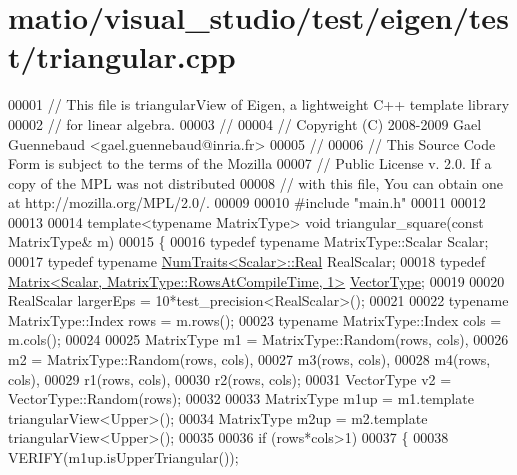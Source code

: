 \hypertarget{matio_2visual__studio_2test_2eigen_2test_2triangular_8cpp_source}{}\section{matio/visual\+\_\+studio/test/eigen/test/triangular.cpp}
\label{matio_2visual__studio_2test_2eigen_2test_2triangular_8cpp_source}

\begin{DoxyCode}
00001 \textcolor{comment}{// This file is triangularView of Eigen, a lightweight C++ template library}
00002 \textcolor{comment}{// for linear algebra.}
00003 \textcolor{comment}{//}
00004 \textcolor{comment}{// Copyright (C) 2008-2009 Gael Guennebaud <gael.guennebaud@inria.fr>}
00005 \textcolor{comment}{//}
00006 \textcolor{comment}{// This Source Code Form is subject to the terms of the Mozilla}
00007 \textcolor{comment}{// Public License v. 2.0. If a copy of the MPL was not distributed}
00008 \textcolor{comment}{// with this file, You can obtain one at http://mozilla.org/MPL/2.0/.}
00009 
00010 \textcolor{preprocessor}{#include "main.h"}
00011 
00012 
00013 
00014 \textcolor{keyword}{template}<\textcolor{keyword}{typename} MatrixType> \textcolor{keywordtype}{void} triangular\_square(\textcolor{keyword}{const} MatrixType& m)
00015 \{
00016   \textcolor{keyword}{typedef} \textcolor{keyword}{typename} MatrixType::Scalar Scalar;
00017   \textcolor{keyword}{typedef} \textcolor{keyword}{typename} \hyperlink{group___core___module_struct_eigen_1_1_num_traits}{NumTraits<Scalar>::Real} RealScalar;
00018   \textcolor{keyword}{typedef} \hyperlink{group___core___module_class_eigen_1_1_matrix}{Matrix<Scalar, MatrixType::RowsAtCompileTime, 1>} 
      \hyperlink{struct_vector_type}{VectorType};
00019 
00020   RealScalar largerEps = 10*test\_precision<RealScalar>();
00021 
00022   \textcolor{keyword}{typename} MatrixType::Index rows = m.rows();
00023   \textcolor{keyword}{typename} MatrixType::Index cols = m.cols();
00024 
00025   MatrixType m1 = MatrixType::Random(rows, cols),
00026              m2 = MatrixType::Random(rows, cols),
00027              m3(rows, cols),
00028              m4(rows, cols),
00029              r1(rows, cols),
00030              r2(rows, cols);
00031   VectorType v2 = VectorType::Random(rows);
00032 
00033   MatrixType m1up = m1.template triangularView<Upper>();
00034   MatrixType m2up = m2.template triangularView<Upper>();
00035 
00036   \textcolor{keywordflow}{if} (rows*cols>1)
00037   \{
00038     VERIFY(m1up.isUpperTriangular());

\end{DoxyCode}
